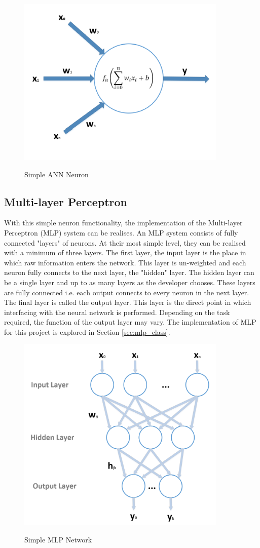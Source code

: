 \documentclass[11pt]{article}
\begin{document}
	\begin{figure}[H]
		\centering
		\includegraphics[width=10cm]{Figures/neuron}
		\caption{Simple ANN Neuron}\cite{Bonaccorso2017}
		\label{fig:neuron}
	\end{figure}

	\subsection{Multi-layer Perceptron}
	With this simple neuron functionality, the implementation of the Multi-layer Perceptron (MLP) system can be realises. An MLP system consists of fully connected "layers" of neurons. At their most simple level, they can be realised with a minimum of three layers. The first layer, the input layer is the place in which raw information enters the network. This layer is un-weighted and each neuron fully connects to the next layer, the "hidden" layer. The hidden layer can be a single layer and up to as many layers as the developer chooses. These layers are fully connected i.e. each output connects to every neuron in the next layer. The final layer is called the output layer. This layer is the direct point in which interfacing with the neural network is performed. Depending on the task required, the function of the output layer may vary. The implementation of MLP for this project is explored in Section \ref{sec:mlp_class}.
	
	\begin{figure}[H]
		\centering
		\includegraphics[width=10cm]{Figures/mlp}
		\caption{Simple MLP Network}\cite{Bonaccorso2017}
		\label{fig:mlp}
	\end{figure}
	
\end{document}
